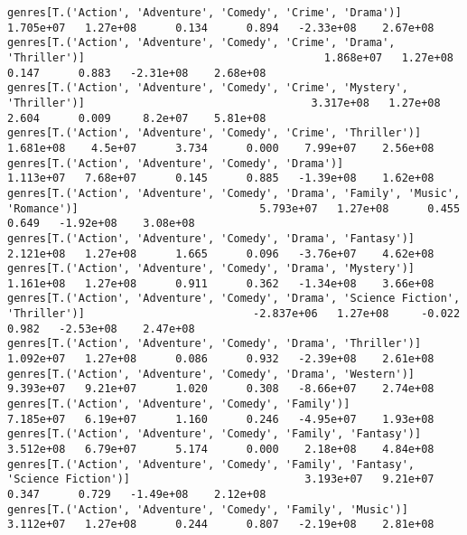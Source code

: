 \documentclass[11pt]{article}
\begin{document}
\begin{Verbatim}[commandchars=\\\{\}]
genres[T.('Action', 'Adventure', 'Comedy', 'Crime', 'Drama')]                                                 1.705e+07   1.27e+08      0.134      0.894   -2.33e+08    2.67e+08
genres[T.('Action', 'Adventure', 'Comedy', 'Crime', 'Drama', 'Thriller')]                                     1.868e+07   1.27e+08      0.147      0.883   -2.31e+08    2.68e+08
genres[T.('Action', 'Adventure', 'Comedy', 'Crime', 'Mystery', 'Thriller')]                                   3.317e+08   1.27e+08      2.604      0.009     8.2e+07    5.81e+08
genres[T.('Action', 'Adventure', 'Comedy', 'Crime', 'Thriller')]                                              1.681e+08    4.5e+07      3.734      0.000    7.99e+07    2.56e+08
genres[T.('Action', 'Adventure', 'Comedy', 'Drama')]                                                          1.113e+07   7.68e+07      0.145      0.885   -1.39e+08    1.62e+08
genres[T.('Action', 'Adventure', 'Comedy', 'Drama', 'Family', 'Music', 'Romance')]                            5.793e+07   1.27e+08      0.455      0.649   -1.92e+08    3.08e+08
genres[T.('Action', 'Adventure', 'Comedy', 'Drama', 'Fantasy')]                                               2.121e+08   1.27e+08      1.665      0.096   -3.76e+07    4.62e+08
genres[T.('Action', 'Adventure', 'Comedy', 'Drama', 'Mystery')]                                               1.161e+08   1.27e+08      0.911      0.362   -1.34e+08    3.66e+08
genres[T.('Action', 'Adventure', 'Comedy', 'Drama', 'Science Fiction', 'Thriller')]                          -2.837e+06   1.27e+08     -0.022      0.982   -2.53e+08    2.47e+08
genres[T.('Action', 'Adventure', 'Comedy', 'Drama', 'Thriller')]                                              1.092e+07   1.27e+08      0.086      0.932   -2.39e+08    2.61e+08
genres[T.('Action', 'Adventure', 'Comedy', 'Drama', 'Western')]                                               9.393e+07   9.21e+07      1.020      0.308   -8.66e+07    2.74e+08
genres[T.('Action', 'Adventure', 'Comedy', 'Family')]                                                         7.185e+07   6.19e+07      1.160      0.246   -4.95e+07    1.93e+08
genres[T.('Action', 'Adventure', 'Comedy', 'Family', 'Fantasy')]                                              3.512e+08   6.79e+07      5.174      0.000    2.18e+08    4.84e+08
genres[T.('Action', 'Adventure', 'Comedy', 'Family', 'Fantasy', 'Science Fiction')]                           3.193e+07   9.21e+07      0.347      0.729   -1.49e+08    2.12e+08
genres[T.('Action', 'Adventure', 'Comedy', 'Family', 'Music')]                                                3.112e+07   1.27e+08      0.244      0.807   -2.19e+08    2.81e+08

\end{Verbatim}
\end{document}
